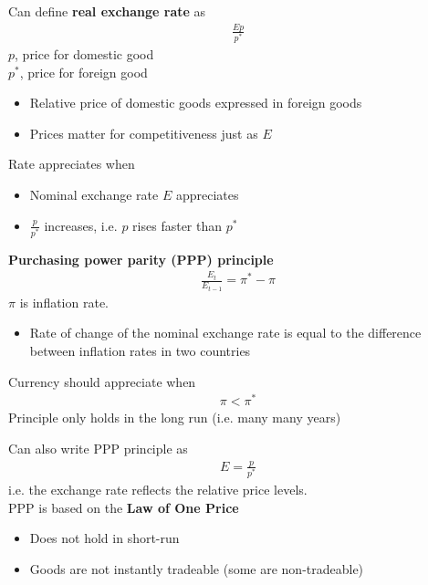 \documentclass{beamer}
\begin{document}
\begin{frame} 
  Can define  \textbf{real exchange rate} as 
  \begin{align}
    \frac{Ep}{p^*}
  \end{align}
  $p$, price for domestic good\\
  $p^*$, price for foreign good
  \begin{itemize}
    \item Relative price of domestic goods expressed in foreign goods
    \item Prices matter for competitiveness just as $E$
  \end{itemize}
  \medskip
  Rate appreciates when
  \begin{itemize}
    \item Nominal exchange rate $E$ appreciates
    \item $\frac{p}{p^*}$ increases, i.e. $p$ rises faster than $p^*$
  \end{itemize}
\end{frame}

\begin{frame}
  \textbf{Purchasing power parity (PPP) principle}
  \begin{align}
    \frac{E_t}{E_{t-1}} = \pi^* - \pi
  \end{align}
  $\pi$ is inflation rate.
  \begin{itemize}
    \item Rate of change of the nominal exchange rate is equal to the difference between inflation rates in two countries    
  \end{itemize}
  \medskip
  Currency should appreciate when
  \begin{align}
    \pi<\pi^*
  \end{align}
  \medskip
  Principle only holds in the long run (i.e. many many years)
\end{frame}

\begin{frame}
  Can also write PPP principle as
  \begin{align}
    E=\frac{p}{p^*}
  \end{align}
  \medskip
  i.e. the exchange rate reflects the relative price levels.\\
  PPP is based on the \textbf{Law of One Price}
  \begin{itemize}
     \item Does not hold in short-run
     \item Goods are not instantly tradeable (some are non-tradeable)
  \end{itemize} 
\end{frame}
\end{document}
